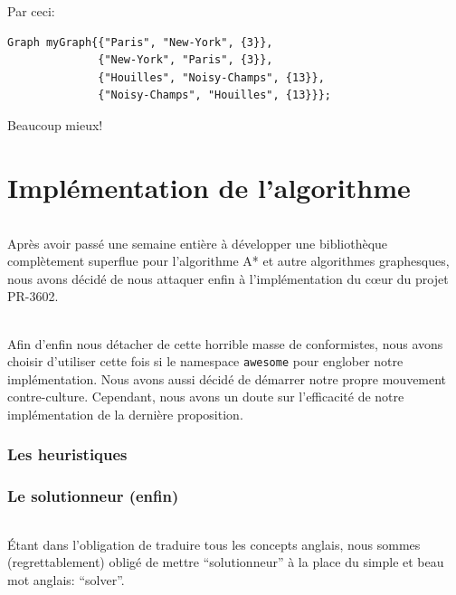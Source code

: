 \documentclass[french]{article}
\begin{document}
Par ceci:

\begin{listing}[H]
\begin{verbatim}
Graph myGraph{{"Paris", "New-York", {3}},
              {"New-York", "Paris", {3}},
              {"Houilles", "Noisy-Champs", {13}},
              {"Noisy-Champs", "Houilles", {13}}};
\end{verbatim}
\caption{Beaucoup mieux!}
\label{tsp:better}
\end{listing}

\part{Implémentation de l'algorithme}

\paragraph{} Après avoir passé une semaine entière à développer une
bibliothèque complètement superflue pour l'algorithme A* et autre algorithmes
graphesques, nous avons décidé de nous attaquer enfin à l'implémentation du
cœur du projet PR-3602.

\paragraph{} Afin d'enfin nous détacher de cette horrible masse de
conformistes, nous avons choisir d'utiliser cette fois si le namespace
\texttt{awesome} pour englober notre implémentation. Nous avons aussi décidé de
démarrer notre propre mouvement contre-culture. Cependant, nous avons un doute
sur l'efficacité de notre implémentation de la dernière proposition.

\section{Les heuristiques}

\section{Le solutionneur (enfin)}

\paragraph{} Étant dans l'obligation de traduire tous les concepts anglais,
nous sommes (regrettablement) obligé de mettre ``solutionneur'' à la place du
simple et beau mot anglais: ``solver''.
\end{document}
